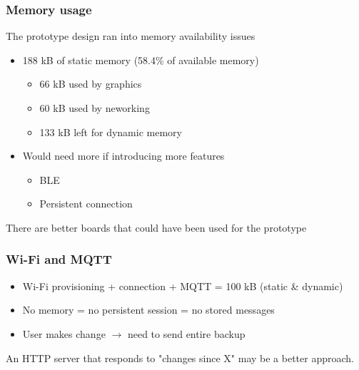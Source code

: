 \documentclass{beamer}
\begin{document}
\begin{frame}
  \frametitle{Memory usage}

  The prototype design ran into memory availability issues
  \begin{itemize}
    \item 188 kB of static memory (58.4\% of available memory)
    \begin{itemize}
      \item 66 kB used by graphics
      \item 60 kB used by neworking
      \item 133 kB left for dynamic memory
    \end{itemize}
    \item Would need more if introducing more features
    \begin{itemize}
      \item BLE
      \item Persistent connection
    \end{itemize}
  \end{itemize}
  There are better boards that could have been used for the prototype


\end{frame}

\begin{frame}
  \frametitle{Wi-Fi and MQTT}

  \begin{itemize}
    \item Wi-Fi provisioning + connection + MQTT = 100 kB (static \& dynamic)
    \item No memory = no persistent session = no stored messages
    \item User makes change $\rightarrow$ need to send entire backup
  \end{itemize}

  An HTTP server that responds to "changes since X" may be a better approach.

\end{frame}
\end{document}
